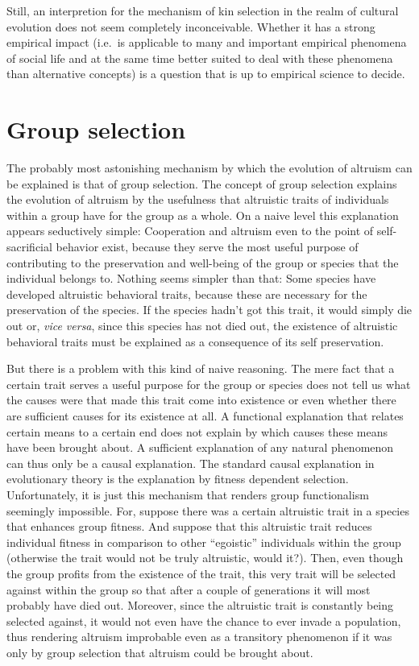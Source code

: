 Still, an interpretion for the mechanism of kin selection in the realm of
cultural evolution does not seem completely inconceivable. Whether it has a
strong empirical impact (i.e.\ is applicable to many and important empirical
phenomena of social life and at the same time better suited to deal with these
phenomena than alternative concepts) is a question that is up to
empirical science to decide.


\section{Group selection}
\label{groupSelection}
The probably most astonishing mechanism by which the evolution of altruism can
be explained is that of group selection. The concept of group selection
explains the evolution of altruism by the usefulness that altruistic traits of
individuals within a group have for the group as a whole. On a naive level
this explanation appears seductively simple: Cooperation and altruism even to
the point of self-sacrificial behavior exist, because they serve the most
useful purpose of contributing to the preservation and well-being of the group
or species that the individual belongs to. Nothing seems simpler than that:
Some species have developed altruistic behavioral traits, because these are
necessary for the preservation of the species. If the species hadn't got this
trait, it would simply die out or, {\em vice versa}, since this species has
not died out, the existence of altruistic behavioral traits must be explained
as a consequence of its self preservation.

But there is a problem with this kind of naive reasoning. The mere fact that a
certain trait serves a useful purpose for the group or species does not tell us
what the causes were that made this trait come into existence or even whether
there are sufficient causes for its existence at all. A functional explanation
that relates certain means to a certain end does not explain by which causes
these means have been brought about. A sufficient explanation of any natural
phenomenon can thus only be a causal explanation. The standard causal
explanation in evolutionary theory is the explanation by fitness dependent
selection. Unfortunately, it is just this mechanism that renders group
functionalism seemingly impossible. For, suppose there was a certain
altruistic trait in a species that enhances group fitness. And
suppose that this altruistic trait reduces individual fitness in
comparison to other ``egoistic'' individuals within the group
(otherwise the trait would not be truly altruistic, would it?). Then,
even though the group profits from the existence of the trait, this
very trait will be selected against within the group so that after a
couple of generations it will most probably have died out. Moreover,
since the altruistic trait is constantly being selected against, it
would not even have the chance to ever invade a population, thus
rendering altruism improbable even as a transitory phenomenon if it
was only by group selection that altruism could be brought about.

